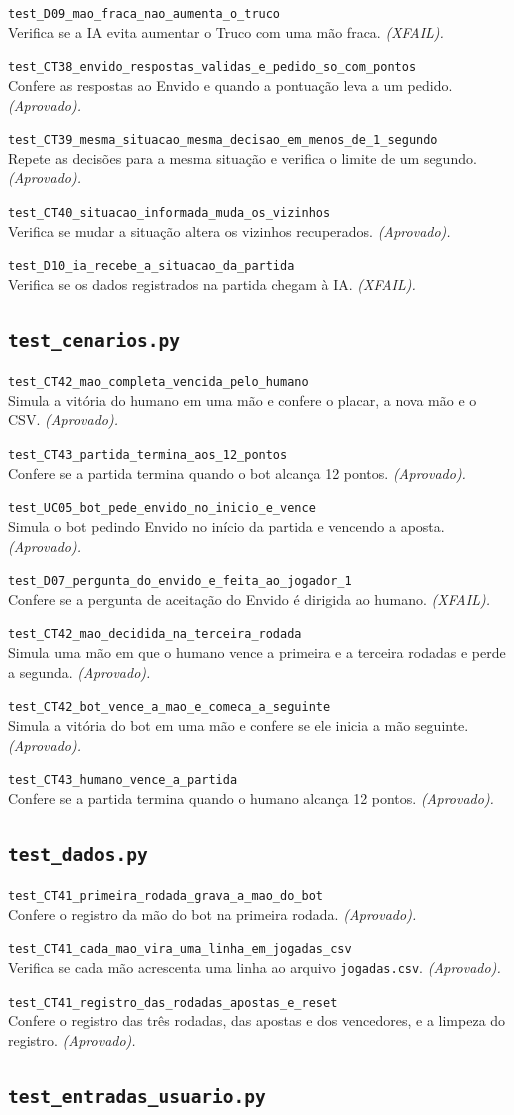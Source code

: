 \documentclass[11pt,a4paper]{article}
\newcommand{\teste}[3]{\par\noindent\begin{minipage}{\textwidth}\texttt{#1}\\#2 \emph{(#3).}\end{minipage}\par\vspace{0.15em}}
\begin{document}
\teste{test\_D09\_mao\_fraca\_nao\_aumenta\_o\_truco}{Verifica se a IA evita aumentar o Truco com uma mão fraca.}{XFAIL}
\teste{test\_CT38\_envido\_respostas\_validas\_e\_pedido\_so\_com\_pontos}{Confere as respostas ao Envido e quando a pontuação leva a um pedido.}{Aprovado}
\teste{test\_CT39\_mesma\_situacao\_mesma\_decisao\_em\_menos\_de\_1\_segundo}{Repete as decisões para a mesma situação e verifica o limite de um segundo.}{Aprovado}
\teste{test\_CT40\_situacao\_informada\_muda\_os\_vizinhos}{Verifica se mudar a situação altera os vizinhos recuperados.}{Aprovado}
\teste{test\_D10\_ia\_recebe\_a\_situacao\_da\_partida}{Verifica se os dados registrados na partida chegam à IA.}{XFAIL}
\subsection*{\texttt{\textbf{test\_cenarios.py}}}
\teste{test\_CT42\_mao\_completa\_vencida\_pelo\_humano}{Simula a vitória do humano em uma mão e confere o placar, a nova mão e o CSV.}{Aprovado}
\teste{test\_CT43\_partida\_termina\_aos\_12\_pontos}{Confere se a partida termina quando o bot alcança 12 pontos.}{Aprovado}
\teste{test\_UC05\_bot\_pede\_envido\_no\_inicio\_e\_vence}{Simula o bot pedindo Envido no início da partida e vencendo a aposta.}{Aprovado}
\teste{test\_D07\_pergunta\_do\_envido\_e\_feita\_ao\_jogador\_1}{Confere se a pergunta de aceitação do Envido é dirigida ao humano.}{XFAIL}
\teste{test\_CT42\_mao\_decidida\_na\_terceira\_rodada}{Simula uma mão em que o humano vence a primeira e a terceira rodadas e perde a segunda.}{Aprovado}
\teste{test\_CT42\_bot\_vence\_a\_mao\_e\_comeca\_a\_seguinte}{Simula a vitória do bot em uma mão e confere se ele inicia a mão seguinte.}{Aprovado}
\teste{test\_CT43\_humano\_vence\_a\_partida}{Confere se a partida termina quando o humano alcança 12 pontos.}{Aprovado}
\subsection*{\texttt{\textbf{test\_dados.py}}}
\teste{test\_CT41\_primeira\_rodada\_grava\_a\_mao\_do\_bot}{Confere o registro da mão do bot na primeira rodada.}{Aprovado}
\teste{test\_CT41\_cada\_mao\_vira\_uma\_linha\_em\_jogadas\_csv}{Verifica se cada mão acrescenta uma linha ao arquivo \texttt{jogadas.csv}.}{Aprovado}
\teste{test\_CT41\_registro\_das\_rodadas\_apostas\_e\_reset}{Confere o registro das três rodadas, das apostas e dos vencedores, e a limpeza do registro.}{Aprovado}
\subsection*{\texttt{\textbf{test\_entradas\_usuario.py}}}
\end{document}
